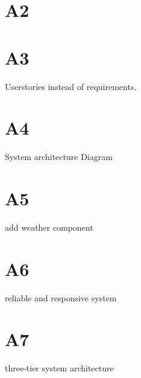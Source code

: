 \documentclass[12pt]{scrartcl}
\begin{document}
\section*{A2}

\section*{A3}
Userstories instead of requirements.

\section*{A4}
System architecture Diagram

\section*{A5}
add weather component

\section*{A6}
reliable and responsive system

\section*{A7}
three-tier system architecture

\end{document}
